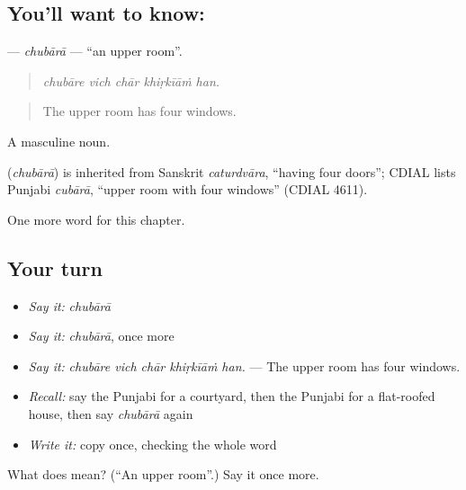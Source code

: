 \subsection*{You'll want to know: }
\textbf{} — \emph{chubārā} — \textquotedblleft{}an upper room\textquotedblright{}.

\begin{quote}
    
\end{quote}

\begin{quote}
\emph{chubāre vich chār khiṛkīāṁ han.}
\end{quote}

\begin{quote}
The upper room has four windows.
\end{quote}

A masculine noun.

\begin{cousinweb}
\textbf{} (\emph{chubārā}) is inherited from Sanskrit \emph{caturdvāra}, \textquotedblleft{}having four doors\textquotedblright{}; CDIAL lists Punjabi \emph{cubārā}, \textquotedblleft{}upper room with four windows\textquotedblright{} (CDIAL 4611).
\end{cousinweb}

\begin{grammarlens}[title={What you've built}]
One more word for this chapter.
\end{grammarlens}

\subsection*{Your turn}
\begin{itemize}
\raggedright
  \item \emph{Say it:} \emph{chubārā}
  \item \emph{Say it:} \emph{chubārā}, once more
  \item \emph{Say it:} \emph{chubāre vich chār khiṛkīāṁ han.} — The upper room has four windows.
  \item \emph{Recall:} say the Punjabi for a courtyard, then the Punjabi for a flat-roofed house, then say \emph{chubārā} again
  \item \emph{Write it:} copy \textbf{} once, checking the whole word
\end{itemize}

\begin{tcolorbox}[breakable,colback=teal!4,colframe=teal!35!black,title={Before you move on}]
What does  mean? (\textquotedblleft{}An upper room\textquotedblright{}.) Say it once more.
\end{tcolorbox}
